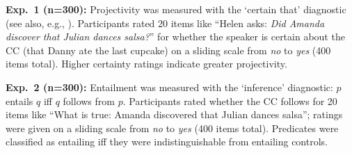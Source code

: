 \documentclass[12pt,fleqn]{article}
\newcommand{\6}{\mbox{$[\hspace*{-.6mm}[$}}
\newcommand{\9}{\mbox{$]\hspace*{-.6mm}]$}}
\begin{document}
{\bf Exp.~1 (n=300):} Projectivity was measured with the `certain that' diagnostic (see also, e.g., \cite{tonhauser-salt26,tbd-variability}). Participants rated 20 items like ``Helen asks: \emph{Did Amanda discover that Julian dances salsa?}'' for whether the speaker is certain about the CC (that Danny ate the last cupcake) on a sliding scale from \emph{no} to \emph{yes} (400 items total). Higher certainty ratings indicate greater projectivity.  

{\bf Exp.~2 (n=300):} Entailment was measured with the `inference' diagnostic: $p$ entails $q$ iff $q$ follows from $p$. %
Participants rated whether the CC follows for 20 items like ``What is true: Amanda discovered that Julian dances salsa''; ratings were given on a sliding scale from \emph{no} to \emph{yes} (400 items total). Predicates were classified as entailing iff they were indistinguishable from entailing controls. 
\end{document}
